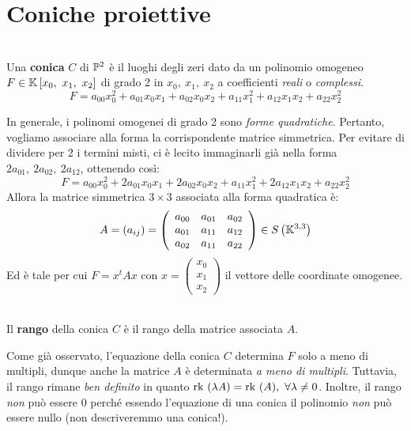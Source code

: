 \section{Coniche proiettive}
\begin{define}[Conica.]~{}\\
		Una \textbf{conica} $C$ di $\proj[2]{\ }$ è il luoghi degli zeri dato da un polinomio omogeneo $F\in\mathbb{K}\left[x_0,\ x_1,\ x_2\right]$ di grado 2 in $x_0,\ x_1,\ x_2$ a coefficienti \textit{reali} o \textit{complessi}.
		\begin{equation*}
			F=a_{00}x_0^2 +a_{01}x_0x_1+a_{02}x_0x_2+a_{11}x_1^2+a_{12}x_1x_2+a_{22}x_2^2
		\end{equation*}
\end{define}
In generale, i polinomi omogenei di grado 2 sono \textit{forme quadratiche}. Pertanto, vogliamo associare alla forma la  corrispondente matrice simmetrica.
Per evitare di dividere per 2 i termini misti, ci è lecito immaginarli già nella forma $2a_{01},\ 2a_{02},\ 2a_{12}$, ottenendo così:
\begin{equation*}
F=a_{00}x_0^2 +2a_{01}x_0x_1+2a_{02}x_0x_2+a_{11}x_1^2+2a_{12}x_1x_2+a_{22}x_2^2
\end{equation*}
Allora la matrice simmetrica $3\times 3$ associata alla forma quadratica è:
\begin{equation}
	A=(a_{ij})=\left(\begin{array}{ccc}
		a_{00} & a_{01} & a_{02}\\
		a_{01} & a_{11} & a_{12}\\
		a_{02} & a_{11} & a_{22}\\
	\end{array}\right)\in S\left(\mathbb{K}^{3,3}\right)
\end{equation}
Ed è tale per cui $\displaystyle F=x^tAx$ con $x=\left( \begin{array}{c}
x_0 \\ x_1 \\ x_2
\end{array} \right)$ il vettore delle coordinate omogenee.\\
\begin{define}~{}\\
Il \textbf{rango} della conica $C$ è il rango della matrice associata $A$.
\end{define}
\begin{observe}
Come già osservato, l'equazione della conica $C$ determina $F$ solo a meno di multipli, dunque anche la matrice $A$ è determinata \textit{a meno di multipli}.
Tuttavia, il rango rimane \textit{ben definito} in quanto $\mathrm{rk}\ (\lambda A)=\mathrm{rk}\ (A),\ \forall\lambda\neq 0$. Inoltre, il rango \textit{non} può essere $0$ perché essendo l'equazione di una conica il polinomio \textit{non} può essere nullo (non descriveremmo una conica!).
\end{observe}
